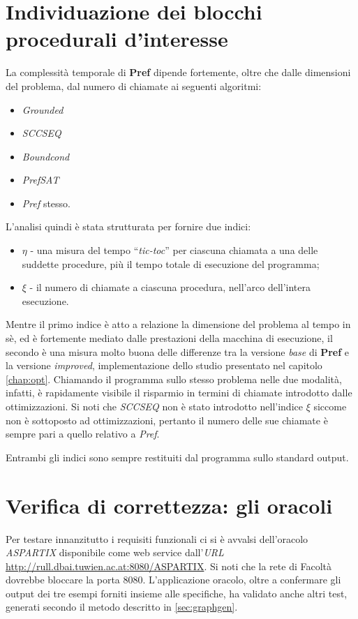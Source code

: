 \section{Individuazione dei blocchi procedurali d'interesse}
La complessità temporale di \textbf{Pref} dipende fortemente, oltre che dalle
dimensioni del problema, dal numero di chiamate ai seguenti algoritmi:
\begin{itemize}
  \item \emph{Grounded}
  \item \emph{SCCSEQ}
  \item \emph{Boundcond}
  \item \emph{PrefSAT}
  \item \emph{Pref} stesso.
\end{itemize}
L'analisi quindi è stata strutturata per fornire due indici:
\begin{itemize}
  \item $\eta$ - una misura del tempo ``\emph{tic-toc}'' per ciascuna chiamata a
  una delle suddette procedure, più il tempo totale di esecuzione del programma;
  \item $\xi$ - il numero di chiamate a ciascuna procedura, nell'arco
  dell'intera esecuzione.
\end{itemize}
Mentre il primo indice è atto a relazione la dimensione del problema al tempo in
sè, ed è fortemente mediato dalle prestazioni della macchina di esecuzione, il
secondo è una misura molto buona delle differenze tra la versione \emph{base} di
\textbf{Pref} e la versione \emph{improved}, implementazione dello studio
presentato nel capitolo \ref{chap:opt}. Chiamando il programma sullo stesso
problema nelle due modalità, infatti, è rapidamente visibile il risparmio in
termini di chiamate introdotto dalle ottimizzazioni. Si noti che \emph{SCCSEQ}
non è stato introdotto nell'indice $\xi$ siccome non è sottoposto ad
ottimizzazioni, pertanto il numero delle sue chiamate è sempre pari a quello
relativo a \emph{Pref}.

 Entrambi gli indici sono sempre restituiti dal programma
sullo standard output.

\section{Verifica di correttezza: gli oracoli} \label{sec:oracles}
Per testare innanzitutto i requisiti funzionali ci si è avvalsi dell'oracolo
\emph{ASPARTIX} disponibile come web service dall'\emph{URL}
\url{http://rull.dbai.tuwien.ac.at:8080/ASPARTIX}. Si noti che la rete di
Facoltà dovrebbe bloccare la porta 8080. L'applicazione oracolo, oltre a
confermare gli output dei tre esempi forniti insieme alle specifiche, ha 
validato anche altri test, generati secondo il metodo descritto in \ref{sec:graphgen}.

